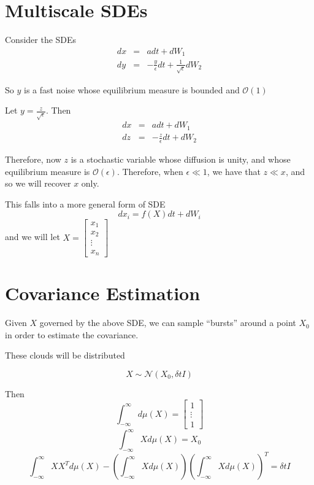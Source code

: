 \documentclass[12pt]{article}
\begin{document}
\section{Multiscale SDEs}

Consider the SDEs
\begin{eqnarray}
dx &=& adt + dW_1\\
dy &=& -\frac{y}{\epsilon} dt + \frac{1}{\sqrt{\epsilon}} dW_2
\end{eqnarray}

So $y$ is a fast noise whose equilibrium measure is bounded and $\mathcal{O}(1)$

Let $y = \frac{z}{\sqrt{\epsilon}}$. Then
\begin{eqnarray}
dx &=& adt + dW_1\\
dz &=& -\frac{z}{\epsilon} dt +  dW_2
\end{eqnarray}

Therefore, now $z$ is a stochastic variable whose diffusion is unity, and whose equilibrium measure is $\mathcal{O}(\epsilon)$. 
%
Therefore, when $\epsilon \ll 1$, we have that $z \ll x$, and so we will recover $x$ only.

This falls into a more general form of SDE
\begin{equation}
dx_i = f(X) dt + dW_i
\end{equation}
and we will let $X = \begin{bmatrix} x_1 \\ x_2 \\ \vdots \\ x_n \end{bmatrix}$

\section{Covariance Estimation}

Given $X$ governed by the above SDE, we can sample ``bursts'' around a point $X_0$ in order to estimate the covariance. 

These clouds will be distributed 

\begin{equation}
X \sim \mathcal{N}\left( X_0, \delta t I \right)
\end{equation}

Then
$$\int_{-\infty}^{\infty} d\mu(X) = \begin{bmatrix} 1 \\ \vdots \\ 1\end{bmatrix}$$
$$\int_{-\infty}^{\infty} X d\mu(X) = X_0$$
$$\int_{-\infty}^{\infty} X X^T d\mu(X) - \left( \int_{-\infty}^{\infty} X d\mu(X) \right) \left( \int_{-\infty}^{\infty} X d\mu(X) \right)^T = \delta t I$$
\end{document}
